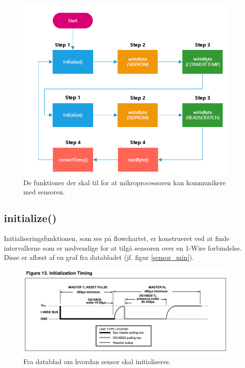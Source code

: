 \begin{figure}[h!]
  \centering
  \includegraphics[width=1\textwidth]{figures/sensor_communication.png}
  \caption{De funktioner der skal til for at mikroprocessoren kan kommunikere med sensoren.}
  \label{sensor_total}
\end{figure}

\newpage
\subsection{initialize()}
Initialiseringsfunktionen, som ses på flowchartet, er konstrueret ved at finde intervallerne som er nødvendige for at tilgå sensoren over en 1-Wire forbindelse. Disse er aflæst af en graf fra databladet (jf. figur \ref{sensor_min}).
\begin{figure}[h!]
  \centering
  \includegraphics[width=1\textwidth]{figures/Initialization_timing.png}
  \caption{Fra datablad om hvordan sensor skal initialiseres.}
  \label{sensor_init}
\end{figure}

